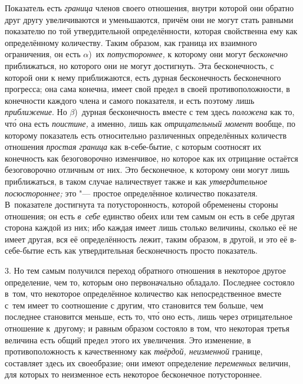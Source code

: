 Показатель есть {\em граница} членов своего отношения, внутри которой они
обратно друг другу увеличиваются и уменьшаются, причём они не могут стать
равными показателю по той утвердительной определённости, которая свойственна
ему как определённому количеству. Таким образом, как граница их взаимного
ограничения, он есть $\alpha$)~их {\em потустороннее,} к которому они могут
{\em бесконечно} приближаться, но которого они не могут достигнуть. Эта
бесконечность, с которой они к нему приближаются, есть дурная бесконечность
бесконечного прогресса; она сама конечна, имеет свой предел в своей
противоположности, в конечности каждого члена и самого показателя, и есть
поэтому лишь {\em приближение}. Но $\beta$)~дурная бесконечность вместе
с тем здесь {\em положена} как то, чт\'{о} она есть {\em поистине,} а именно,
лишь как {\em отрицательный момент} вообще, по которому показатель есть
относительно различенных определённых количеств отношения {\em простая граница}
как в-себе-бытие, с которым соотносят их конечность как безоговорочно
изменчивое, но которое как их отрицание остаётся безоговорочно отличным от них.
Это бесконечное, к которому они могут лишь приближаться, в таком случае
наличествует также и как {\em утвердительное посюстороннее;} это "--- простое
определённое количество показателя. В~показателе достигнута та потусторонность,
которой обременены стороны отношения; он есть {\em в~себе} единство обеих или
тем самым он есть в себе другая сторона каждой из них; ибо каждая имеет лишь
столько величины, сколько её не имеет другая, вся её определённость лежит,
таким образом, в другой, и это её в-себе-бытие есть как утвердительная
бесконечность просто показатель.

3. Но тем самым получился переход обратного отношения в некоторое другое
определение, чем то, которым оно первоначально обладало. Последнее состояло
в~том, что некоторое определённое количество как непосредственное вместе с~тем
имеет то соотношение с другим, что становится тем больше, чем последнее
становится меньше, есть то, чт\'{о} оно есть, лишь через отрицательное
отношение к~другому; и равным образом состояло в том, что некоторая третья
величина есть общий предел этого их увеличения. Это изменение, в
противоположность к качественному как {\em твёрдой, неизменной} границе,
составляет здесь их своеобразие; они имеют определение {\em переменных}
величин, для которых то неизменное есть некоторое бесконечное потустороннее.

